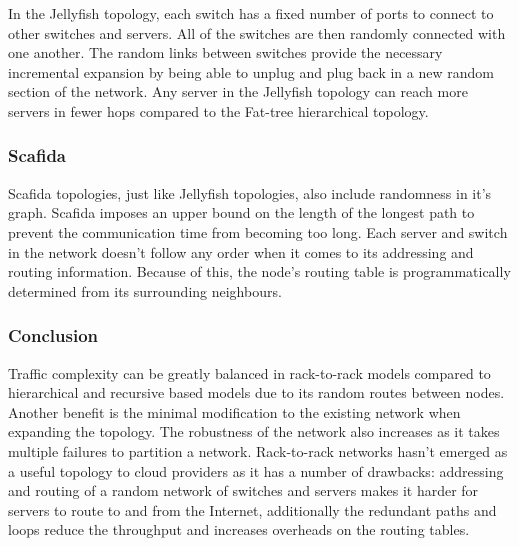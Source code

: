 \documentclass[fullapage,12pt]{article}
\begin{document}
In the Jellyfish topology, each switch has a fixed number of ports to connect to other switches and servers. All of the switches are then randomly connected with one another. The random links between switches provide the necessary incremental expansion by being able to unplug and plug back in a new random section of the network. Any server in the Jellyfish topology can reach more servers in fewer hops compared to the Fat-tree hierarchical topology.


\subsubsection{Scafida} \label{subp:scafida}

Scafida topologies, just like Jellyfish topologies, also include randomness in it's graph. Scafida imposes an upper bound on the length of the longest path to prevent the communication time from becoming too long. Each server and switch in the network doesn't follow any order when it comes to its addressing and routing information. Because of this, the node's routing table is programmatically determined from its surrounding neighbours.



\subsubsection{Conclusion} \label{ssub:rack-concl}


Traffic complexity can be greatly balanced in rack-to-rack models compared to hierarchical and recursive based models due to its random routes between nodes. Another benefit is the minimal modification to the existing network when expanding the topology. The robustness of the network also increases as it takes multiple failures to partition a network. Rack-to-rack networks hasn't emerged as a useful topology to cloud providers as it has a number of drawbacks: addressing and routing of a random network of switches and servers makes it harder for servers to route to and from the Internet, additionally the redundant paths and loops reduce the throughput and increases overheads on the routing tables.



\end{document}
